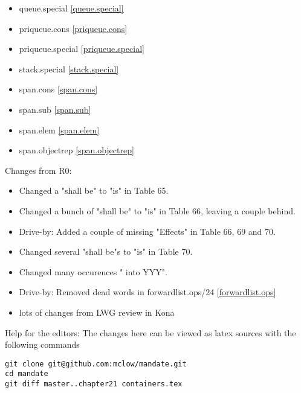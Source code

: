 \begin{multicols}{2}
\begin{itemize}
\item{queue.special     \ref{queue.special}}
\item{priqueue.cons     \ref{priqueue.cons}}
\item{priqueue.special  \ref{priqueue.special}}
\item{stack.special     \ref{stack.special}}
\item{span.cons         \ref{span.cons}}

\item{span.sub        \ref{span.sub}}
\item{span.elem       \ref{span.elem}}
\item{span.objectrep  \ref{span.objectrep}}
\end{itemize}
\end{multicols}

Changes from R0:
\begin{itemize}
\item{Changed a "shall be" to "is" in Table 65.}
\item{Changed a bunch of "shall be" to "is" in Table 66, leaving a couple behind.}
\item{Drive-by: Added a couple of missing "Effects" in Table 66, 69 and 70.}
\item{Changed several "shall be"s to "is" in Table 70.}
\item{Changed many occurences "  into YYY".}
\item{Drive-by: Removed dead words in forwardlist.ops/24 \ref{forwardlist.ops}}
\item{lots of changes from LWG review in Kona}
\end{itemize}

\vfill
Help for the editors: The changes here can be viewed as latex sources with the following commands
\begin{verbatim}
git clone git@github.com:mclow/mandate.git
cd mandate
git diff master..chapter21 containers.tex
\end{verbatim}
\newpage
